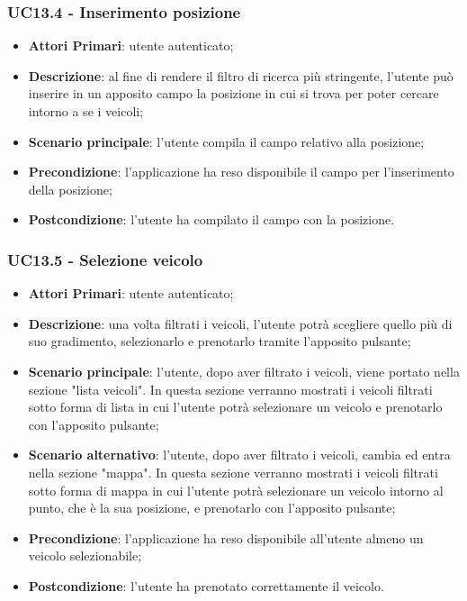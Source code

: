 \subsubsection{UC13.4 - Inserimento posizione}
\begin{itemize}
	\item \textbf{Attori Primari}: utente autenticato;
	\item \textbf{Descrizione}: al fine di rendere il filtro di ricerca più stringente, l'utente può inserire in un apposito campo la posizione in cui si trova per poter cercare intorno a se i veicoli;
	\item \textbf{Scenario principale}: l'utente compila il campo relativo alla posizione;	
	\item \textbf{Precondizione}: l'applicazione ha reso disponibile il campo per l'inserimento della posizione;
	\item \textbf{Postcondizione}: l'utente ha compilato il campo con la posizione.	
\end{itemize}
\subsubsection{UC13.5 - Selezione veicolo}
\begin{itemize}
	\item \textbf{Attori Primari}: utente autenticato;
	\item \textbf{Descrizione}: una volta filtrati i veicoli, l'utente potrà scegliere quello più di suo gradimento, selezionarlo e prenotarlo tramite l'apposito pulsante;
	\item \textbf{Scenario principale}: 
	l'utente, dopo aver filtrato i veicoli, viene portato nella sezione "lista veicoli". In questa sezione verranno mostrati i veicoli filtrati sotto forma di lista in cui l'utente potrà selezionare un veicolo e prenotarlo con l'apposito pulsante;
	\item \textbf{Scenario alternativo}: l'utente, dopo aver filtrato i veicoli, cambia ed entra nella sezione "mappa". In questa sezione verranno mostrati i veicoli filtrati sotto forma di mappa in cui l'utente potrà selezionare un veicolo intorno al punto, che è la sua posizione, e prenotarlo con l'apposito pulsante;
	\item \textbf{Precondizione}: l'applicazione ha reso disponibile all'utente almeno un veicolo selezionabile;
	\item \textbf{Postcondizione}: l'utente ha prenotato correttamente il veicolo.
\end{itemize}

